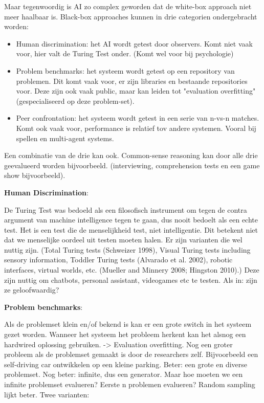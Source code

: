 \documentclass[11pt]{article}
\begin{document}
Maar tegenwoordig is AI zo complex geworden dat de white-box approach niet meer haalbaar is. Black-box approaches kunnen in drie categorien ondergebracht worden:

\begin{itemize}
\item Human discrimination: het AI wordt getest door observers. Komt niet vaak voor, hier valt de Turing Test onder. (Komt wel voor bij psychologie)
\item Problem benchmarks: het systeem wordt getest op een repository van problemen. Dit komt vaak voor, er zijn libraries en bestaande repositories voor. Deze zijn ook vaak public, maar kan leiden tot "evaluation overfitting" (gespecialiseerd op deze problem-set).
\item Peer confrontation: het systeem wordt getest in een serie van n-vs-n matches. Komt ook vaak voor, performance is relatief tov andere systemen. Vooral bij spellen en multi-agent systems.
\end{itemize}

Een combinatie van de drie kan ook. Common-sense reasoning kan door alle drie geevalueerd worden bijvoorbeeld. (interviewing, comprehension tests en een game show bijvoorbeeld).

\textbf{Human Discrimination}:

De Turing Test was bedoeld als een filosofisch instrument om tegen de contra argument van machine intelligence tegen te gaan, dus nooit bedoelt als een echte test. Het is een test die de menselijkheid test, niet intelligentie. Dit betekent niet dat we menselijke oordeel uit testen moeten halen. Er zijn varianten die wel nuttig zijn. (Total Turing tests (Schweizer 1998), Visual Turing tests including sensory information, Toddler Turing tests (Alvarado et al. 2002), robotic interfaces, virtual worlds, etc. (Mueller and Minnery 2008; Hingston 2010).) Deze zijn nuttig om chatbots, personal assistant, videogames etc te testen. Als in: zijn ze geloofwaardig?

\textbf{Problem benchmarks}:

Als de problemset klein en/of bekend is kan er een grote switch in het systeem gezet worden. Wanneer het systeem het probleem herkent kan het alsnog een hardwired oplossing gebruiken. -> Evaluation overfitting. Nog een groter probleem als de problemset gemaakt is door de researchers zelf. Bijvoorbeeld een self-driving car ontwikkelen op een kleine parking. Beter: een grote en diverse problemset. Nog beter: infinite, dus een generator. Maar hoe moeten we een infinite problemset evalueren? Eerste n problemen evalueren? Random sampling lijkt beter. Twee varianten:
\end{document}
